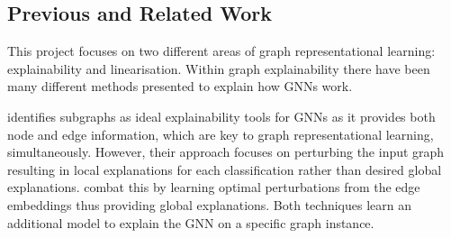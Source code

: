 %



\subsection{Previous and Related Work}
This project focuses on two different areas of graph representational learning: explainability and linearisation.
Within graph explainability there have been many different methods presented to explain how GNNs work.

\citet{ying2019gnnexplainer} identifies subgraphs as ideal explainability tools for GNNs as it provides both node and edge information, which are key to graph representational learning, simultaneously. 
However, their approach focuses on perturbing the input graph resulting in local explanations for each classification rather than desired global explanations.
\citet{luo2020parameterized} combat this by learning optimal perturbations from the edge embeddings thus providing global explanations.
Both techniques learn an additional model to explain the GNN on a specific graph instance.

